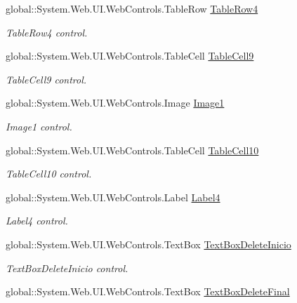 \begin{DoxyCompactItemize}
global::System.Web.UI.WebControls.TableRow \hyperlink{class_sistema_r_h_1_1tab__default_a107b1ffc0d66d24e04ded294ad6f6af3}{TableRow4}
\begin{DoxyCompactList}\small\item\em TableRow4 control. \item\end{DoxyCompactList}\item 
global::System.Web.UI.WebControls.TableCell \hyperlink{class_sistema_r_h_1_1tab__default_a71bd839cd0b72c6908b79ef17d3ab10b}{TableCell9}
\begin{DoxyCompactList}\small\item\em TableCell9 control. \item\end{DoxyCompactList}\item 
global::System.Web.UI.WebControls.Image \hyperlink{class_sistema_r_h_1_1tab__default_a0954d3e08f2141911994f69af31982db}{Image1}
\begin{DoxyCompactList}\small\item\em Image1 control. \item\end{DoxyCompactList}\item 
global::System.Web.UI.WebControls.TableCell \hyperlink{class_sistema_r_h_1_1tab__default_a134d4af0391d97f909a183ec253058d3}{TableCell10}
\begin{DoxyCompactList}\small\item\em TableCell10 control. \item\end{DoxyCompactList}\item 
global::System.Web.UI.WebControls.Label \hyperlink{class_sistema_r_h_1_1tab__default_af63d88312a2d87cff111d336edf7d127}{Label4}
\begin{DoxyCompactList}\small\item\em Label4 control. \item\end{DoxyCompactList}\item 
global::System.Web.UI.WebControls.TextBox \hyperlink{class_sistema_r_h_1_1tab__default_a2a3d69806b2f9a7dc9725ad82fa805b2}{TextBoxDeleteInicio}
\begin{DoxyCompactList}\small\item\em TextBoxDeleteInicio control. \item\end{DoxyCompactList}\item 
global::System.Web.UI.WebControls.TextBox \hyperlink{class_sistema_r_h_1_1tab__default_a39fd36375294cf2a913cfb885371f852}{TextBoxDeleteFinal}

\end{DoxyCompactItemize}
